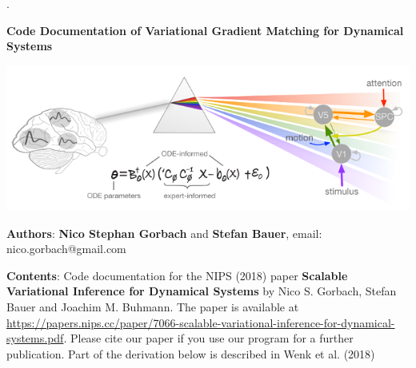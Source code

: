 \begin{center}

{.}
  \vspace{3cm}

  \thispagestyle{empty}

  
  {\LARGE\bf Code Documentation of Variational Gradient Matching for Dynamical Systems}
  
  \thispagestyle{empty}
             


  \vspace{1.2cm}

\includegraphics[width=6in]{cover_pic.png}
\end{center}
\vspace{2cm}
 {\Large \textbf{Authors}:\vspace{0.4cm}
\newline \textbf{Nico Stephan Gorbach} and \textbf{Stefan Bauer}, email: nico.gorbach@gmail.com}

\vspace{4cm}
{{\Large\textbf{Contents}:}\vspace{0.4cm}
\newline Code documentation for the NIPS (2018) paper \textbf{Scalable Variational Inference for Dynamical Systems} by Nico S. Gorbach, Stefan Bauer and Joachim M. Buhmann. The paper is available at \url{https://papers.nips.cc/paper/7066-scalable-variational-inference-for-dynamical-systems.pdf}. Please cite our paper if you use our program for a further publication. Part of the derivation below is described in Wenk et al. (2018)}


